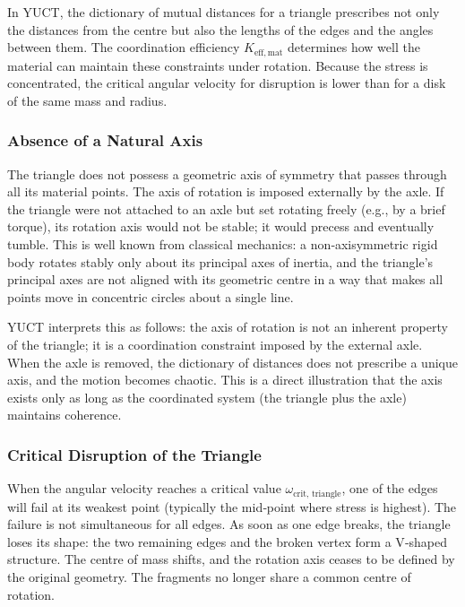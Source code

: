 \documentclass[12pt,a4paper]{article}
\begin{document}
	In YUCT, the dictionary of mutual distances for a triangle prescribes not only the distances from the centre but also the lengths of the edges and the angles between them. The coordination efficiency \(K_{\mathrm{eff,mat}}\) determines how well the material can maintain these constraints under rotation. Because the stress is concentrated, the critical angular velocity for disruption is lower than for a disk of the same mass and radius.
	
	\subsubsection{Absence of a Natural Axis}
	
	The triangle does not possess a geometric axis of symmetry that passes through all its material points. The axis of rotation is imposed externally by the axle. If the triangle were not attached to an axle but set rotating freely (e.g., by a brief torque), its rotation axis would not be stable; it would precess and eventually tumble. This is well known from classical mechanics: a non‑axisymmetric rigid body rotates stably only about its principal axes of inertia, and the triangle’s principal axes are not aligned with its geometric centre in a way that makes all points move in concentric circles about a single line.
	
	YUCT interprets this as follows: the axis of rotation is not an inherent property of the triangle; it is a coordination constraint imposed by the external axle. When the axle is removed, the dictionary of distances does not prescribe a unique axis, and the motion becomes chaotic. This is a direct illustration that the axis exists only as long as the coordinated system (the triangle plus the axle) maintains coherence.
	
	\subsubsection{Critical Disruption of the Triangle}
	
	When the angular velocity reaches a critical value \(\omega_{\text{crit, triangle}}\), one of the edges will fail at its weakest point (typically the mid‑point where stress is highest). The failure is not simultaneous for all edges. As soon as one edge breaks, the triangle loses its shape: the two remaining edges and the broken vertex form a V‑shaped structure. The centre of mass shifts, and the rotation axis ceases to be defined by the original geometry. The fragments no longer share a common centre of rotation.
	
\end{document}
